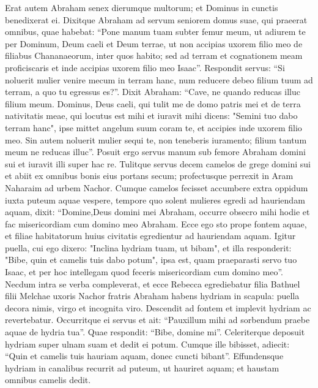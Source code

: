 \begin{biblechapter}  
\verse Erat autem Abraham senex dierumque multorum; et Dominus in cunctis benedixerat ei. 
\verse Dixitque Abraham ad servum seniorem domus suae, qui praeerat omnibus, quae habebat: “Pone manum tuam subter femur meum, 
\verse ut adiurem te per Dominum, Deum caeli et Deum terrae, ut non accipias uxorem filio meo de filiabus Chananaeorum, inter quos habito; 
\verse sed ad terram et cognationem meam proficiscaris et inde accipias uxorem filio meo Isaac”. 
\verse Respondit servus: “Si noluerit mulier venire mecum in terram hanc, num reducere debeo filium tuum ad terram, a quo tu egressus es?”. 
\verse Dixit Abraham: “Cave, ne quando reducas illuc filium meum. 
\verse Dominus, Deus caeli, qui tulit me de domo patris mei et de terra nativitatis meae, qui locutus est mihi et iuravit mihi dicens: "Semini tuo dabo terram hanc", ipse mittet angelum suum coram te, et accipies inde uxorem filio meo. 
\verse Sin autem noluerit mulier sequi te, non teneberis iuramento; filium tantum meum ne reducas illuc”.  
\verse Posuit ergo servus manum sub femore Abraham domini sui et iuravit illi super hac re. 
\verse Tulitque servus decem camelos de grege domini sui et abiit ex omnibus bonis eius portans secum; profectusque perrexit in Aram Naharaim ad urbem Nachor. 
\verse Cumque camelos fecisset accumbere extra oppidum iuxta puteum aquae vespere, tempore quo solent mulieres egredi ad hauriendam aquam, dixit: 
\verse “Domine,Deus domini mei Abraham, occurre obsecro mihi hodie et fac misericordiam cum domino meo Abraham. 
\verse Ecce ego sto prope fontem aquae, et filiae habitatorum huius civitatis egredientur ad hauriendam aquam. 
\verse Igitur puella, cui ego dixero: "Inclina hydriam tuam, ut bibam", et illa responderit: "Bibe, quin et camelis tuis dabo potum", ipsa est, quam praeparasti servo tuo Isaac, et per hoc intellegam quod feceris misericordiam cum domino meo”. 
\verse Necdum intra se verba compleverat, et ecce Rebecca egrediebatur filia Bathuel filii Melchae uxoris Nachor fratris Abraham habens hydriam in scapula: 
\verse puella decora nimis, virgo et incognita viro. Descendit ad fontem et implevit hydriam ac revertebatur. 
\verse Occurritque ei servus et ait: “Pauxillum mihi ad sorbendum praebe aquae de hydria tua”. 
\verse Quae respondit: “Bibe, domine mi”. Celeriterque deposuit hydriam super ulnam suam et dedit ei potum. 
\verse Cumque ille bibisset, adiecit: “Quin et camelis tuis hauriam aquam, donec cuncti bibant”. 
\verse Effundensque hydriam in canalibus recurrit ad puteum, ut hauriret aquam; et haustam omnibus camelis dedit. 

\end{biblechapter}
